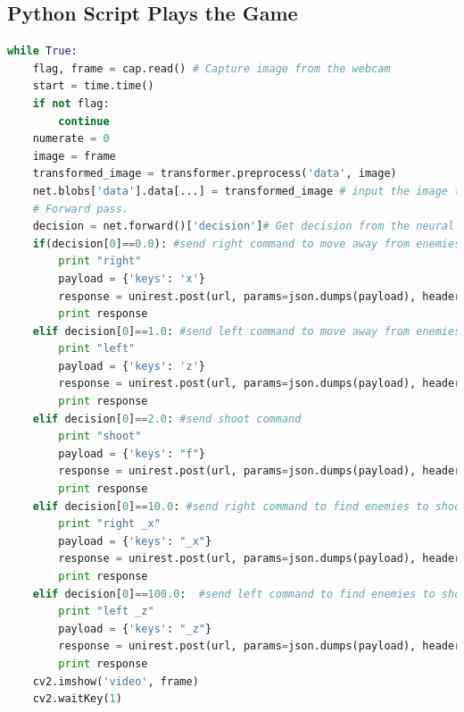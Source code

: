 \documentclass[onecolumn, draftclsnofoot,10pt, compsoc]{IEEEtran}
\begin{document}
\subsection{Python Script Plays the Game}
\begin{lstlisting}[language=Python,caption=Python script captures image and feed to nerual network to send a decision to the other computer.]
while True:
    flag, frame = cap.read() # Capture image from the webcam
    start = time.time()
    if not flag:
        continue
    numerate = 0
    image = frame
    transformed_image = transformer.preprocess('data', image)
    net.blobs['data'].data[...] = transformed_image # input the image to neural network
    # Forward pass.
    decision = net.forward()['decision']# Get decision from the neural network.
    if(decision[0]==0.0): #send right command to move away from enemies
        print "right"
        payload = {'keys': 'x'}
        response = unirest.post(url, params=json.dumps(payload), headers=headers, callback=callback_function)
        print response
    elif decision[0]==1.0: #send left command to move away from enemies
        print "left"
        payload = {'keys': 'z'}
        response = unirest.post(url, params=json.dumps(payload), headers=headers, callback=callback_function)
        print response
    elif decision[0]==2.0: #send shoot command
        print "shoot"
        payload = {'keys': "f"}
        response = unirest.post(url, params=json.dumps(payload), headers=headers, callback=callback_function)
        print response
    elif decision[0]==10.0: #send right command to find enemies to shoot
        print "right _x"
        payload = {'keys': "_x"}
        response = unirest.post(url, params=json.dumps(payload), headers=headers)#, callback=callback_function)
        print response
    elif decision[0]==100.0:  #send left command to find enemies to shoot
        print "left _z"
        payload = {'keys': "_z"}
        response = unirest.post(url, params=json.dumps(payload), headers=headers)#, callback=callback_function)
        print response
    cv2.imshow('video', frame)
    cv2.waitKey(1)
\end{lstlisting}
\end{document}
